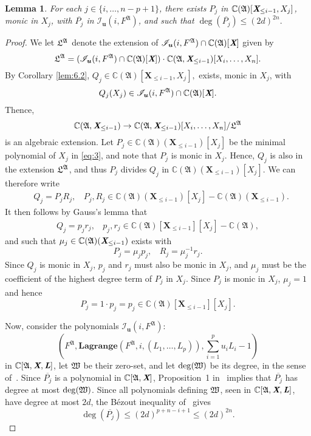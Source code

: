 \documentclass[a4paper]{article}
\def\A{\mathfrak{A}}
\def\Lb{\textit{\textbf{L}}}
\def\Xb{\textit{\textbf{X}}}
\def\ub{{\bm u}}
\def\pjb{\overline{P_{j}}}
\def\C{\mathbb{C}}
\def\lagFfA{{\bm{Lagrange}}(F^{\A},i,(L_1,\hdots,L_p))}
\def\IilfA{\mathscr{I}_{\ub}(i,F^{\A})}
\def\udl{\sum_{i=1}^pu_iL_i}
\newtheorem{lemma}[theorem]{Lemma}
\begin{document}
    \begin{lemma} 
    For each $j \in \{i,\dots,n-p+1\}$, there exists $P_j$ in $
    \C(\A)[\Xb_{\leq i-1},X_j]$, monic in $X_j$, with $\pjb$ in
    $\IilfA$, and such that $\deg(\pjb)\leq (2d)^{2n}.$
    \end{lemma} 

\begin{proof}
     We let $\frak L^\A$ denote the extension of $\IilfA \cap \C(\A)[\Xb]$ given by 
  \[
  \frak
  L^\A =(\IilfA \cap \C(\A)[\Xb])\cdot \C(\frak A, \Xb_{\leq i-1})[X_i,\dots,X_n].
  \]
  By Corollary \ref{lem:6.2}, $Q_j\in\C(\A)[\textbf{X}_{\leq i-1},X_j],$ exists, monic in $X_j$, with 
    \[
    Q_j(X_j) \in \IilfA \cap \C(\A)[\Xb].
    \]
  Thence,
  \begin{equation}\label{eq:3}
    \C(\frak A, \Xb_{\leq i-1}) \to \C(\frak A,
    \Xb_{\leq i-1})[X_i,\dots,X_n]/\frak L^\A
  \end{equation}
    is an algebraic extension. Let $P_j \in \C(\A)(\textbf{X}_{\leq i-1})[X_j]$ 
be the minimal polynomial of $X_j$ in \eqref{eq:3}, and note that $P_j$ is monic in $X_j.$ 
    Hence, $Q_j$ is also in the extension $\frak{L}^\A$, and thus $P_j$ divides $Q_j$ in $\C(\A)(\textbf{X}_{\leq i-1})[X_j].$ We can therefore write 
    \begin{align*}
    &Q_j = P_jR_j,~~~~ P_j,R_j \in \C(\A)(\textbf{X}_{\leq i-1})[X_j]-\C(\A)(\textbf{X}_{\leq i-1}).
    \end{align*}
    It then follows by Gauss's lemma that 
    \begin{align*}
    Q_j = p_jr_j, ~~~~p_j,r_j \in \C(\A)[\textbf{X}_{\leq i-1}][X_j]-\C(\A),
    \end{align*}
    and such that $\mu_j \in \C(\A)(\Xb_{\leq i-1})$ exists with 
    \[
    P_j = \mu_j p_j,~~~~ R_j = \mu_j^{-1}r_j.
    \]
    Since $Q_j$ is monic in $X_j$, $p_j$ and $r_j$ must also be monic in $X_j$, and $\mu_j$ must be the coefficient of the highest degree term of $P_j$ in $X_j.$ Since $P_j$ is monic in $X_j$, $\mu_j =1$ and hence \[P_j=1\cdot p_j=p_j \in \C(\A)[\textbf{X}_{\leq i-1}][X_j].\]

  \noindent 
  Now, consider the polynomials $\IilfA:$
\[
 \left(F^{\A}, \lagFfA,\udl-1 \right)
\]
in $\C[\A,\Xb,\Lb]$, let $\frak W$ be their zero-set, and let $\deg(\frak W)$ be its
  degree, in the sense of~\cite{H}. Since $\pjb$ is a polynomial in $\C[\A,\Xb]$, Proposition~1 in~\cite{CGR} 
  implies that $\pjb$ has degree at most $\deg(\frak W)$. Since all
  polynomials defining $\frak W$, seen in $\C[\A,\Xb,\Lb]$, have
  degree at most $2d$, the B\'ezout inequality of~\cite{H} gives
  \[\deg(\pjb) \le (2d)^{p+n-i+1} \le (2d)^{2n}.\]
\end{proof}
\end{document}
